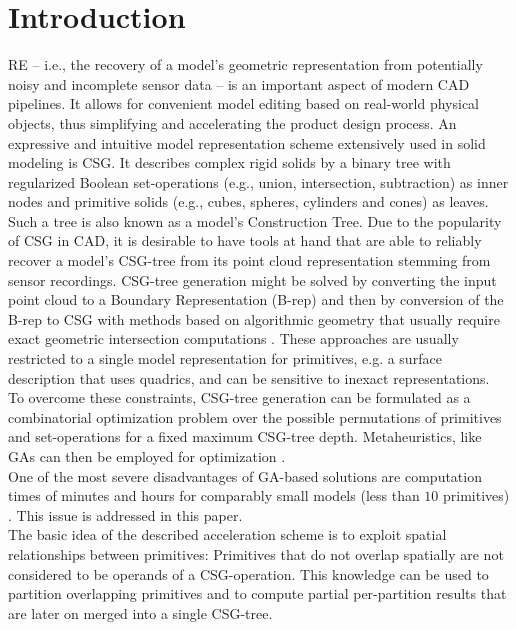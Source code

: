 \section{Introduction}
\ac{RE} -- i.e., the recovery of a model's geometric representation from potentially noisy and incomplete sensor data -- is an important aspect of modern \ac{CAD} pipelines. 
It allows for convenient model editing based on real-world physical objects, thus simplifying and accelerating the product design process.
An expressive and intuitive model representation scheme extensively used in solid modeling is \ac{CSG}.
It describes complex rigid solids by a binary tree with regularized Boolean set-operations (e.g., union, intersection, subtraction) as inner nodes and primitive solids (e.g., cubes, spheres, cylinders and cones) as leaves. 
\copyrightspace
Such a tree is also known as a model's Construction Tree.
Due to the popularity of \ac{CSG} in \ac{CAD}, it is desirable to have tools at hand that are able to reliably recover a model's \ac{CSG}-tree from its point cloud representation stemming from sensor recordings.
\ac{CSG}-tree generation might be solved by converting the input point cloud to a Boundary Representation (B-rep) and then by conversion of the B-rep to CSG with methods based on algorithmic geometry that usually require exact geometric intersection computations \cite{shapiro1993separation, buchele2004three}. 
These approaches are usually restricted to a single model representation for primitives, e.g. a surface description that uses quadrics, and can be sensitive to inexact representations. 
\\
To overcome these constraints, \ac{CSG}-tree generation can be formulated as a combinatorial optimization problem over the possible permutations of primitives and set-operations for a fixed maximum \ac{CSG}-tree depth.
Metaheuristics, like \acp{GA} can then be employed for optimization \cite{mitchell1998introduction}.
\\
One of the most severe disadvantages of \ac{GA}-based solutions are computation times of minutes and hours for comparably small models (less than $10$ primitives) \cite{fayolle2016evolutionary}.
This issue is addressed in this paper.  
\\
The basic idea of the described acceleration scheme is to exploit spatial relationships between primitives: 
Primitives that do not overlap spatially are not considered to be operands of a \ac{CSG}-operation.
This knowledge can be used to partition overlapping primitives and to compute partial per-partition results that are later on merged into a single \ac{CSG}-tree. 
